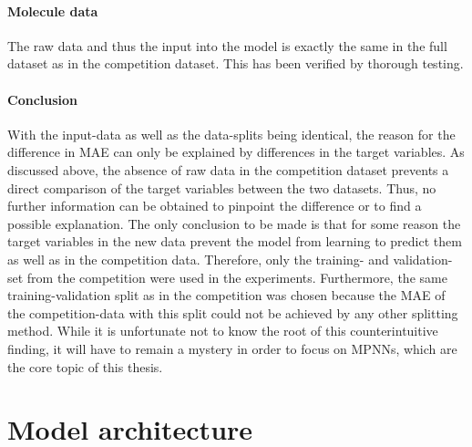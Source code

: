 
\paragraph*{Molecule data}

The raw data and thus the input into the model is exactly the same in the full dataset as in the competition dataset. This has been verified by thorough testing.

\paragraph*{Conclusion}

With the input-data as well as the data-splits being identical, the reason for the difference in MAE can only be explained by differences in the target variables. As discussed above, the absence of raw data in the competition dataset prevents a direct comparison of the target variables between the two datasets. Thus, no further information can be obtained to pinpoint the difference or to find a possible explanation. The only conclusion to be made is that for some reason the target variables in the new data prevent the model from learning to predict them as well as in the competition data. Therefore, only the training- and validation-set from the competition were used in the experiments. Furthermore, the same training-validation split as in the competition was chosen because the MAE of the competition-data with this split could not be achieved by any other splitting method. While it is unfortunate not to know the root of this counterintuitive finding, it will have to remain a mystery in order to focus on MPNNs, which are the core topic of this thesis.


\section{Model architecture}
\label{sec:architecture}


